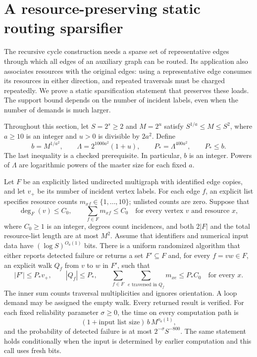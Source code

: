\section{A resource-preserving static routing sparsifier}
\label{sec:routing-helper}

The recursive cycle construction needs a sparse set of representative edges
through which all edges of an auxiliary graph can be routed.  Its application
also associates resources with the original edges: using a representative
edge consumes its resources in either direction, and repeated traversals must
be charged repeatedly.  We prove a static sparsification statement that
preserves these loads.  The support bound depends on the number of incident
labels, even when the number of demands is much larger.

Throughout this section, let $S=2^s\ge2$ and $M=2^u$ satisfy
$S^{1/a}\le M\le S^2$, where $a\ge10$ is an integer and $u>0$ is divisible
by $2a^2$.  Define
\begin{equation}\label{route:parameters}
 b=M^{1/a^2},\qquad
 \Lambda=2^{1000a^2}(1+u),\qquad P_*=\Lambda^{400a^2},
 \qquad P_*\le b.
\end{equation}
The last inequality is a checked prerequisite.  In particular, $b$ is an
integer.  Powers of $\Lambda$ are logarithmic powers of the master size for
each fixed $a$.

\begin{lemma}\label{lem:routing-helper}
Let $F$ be an explicitly listed undirected multigraph with identified edge
copies, and let $v_+$ be its number of incident vertex labels.  For each
edge $f$, an explicit list specifies resource counts
$m_{xf}\in\{1,\ldots,10\}$; unlisted counts are zero.  Suppose that
\[
 \deg_F(v)\le C_0,\qquad \sum_{f\in F}m_{xf}\le C_0
 \quad\text{for every vertex $v$ and resource $x$},
\]
where $C_0\ge1$ is an integer, degrees count incidences, and both $2|F|$
and the total resource-list length are at most $M^2$.
Assume that identifiers and numerical input data have
$(\log S)^{O_a(1)}$ bits.  There is a uniform randomized algorithm that
either reports detected failure or returns a set $F'\subseteq F$ and,
for every $f=vw\in F$, an explicit walk $Q_f$ from $v$ to $w$ in $F'$,
such that
\begin{equation}\label{route:guarantees}
 |F'|\le P_*v_+,\qquad
 |Q_f|\le P_*,\qquad
 \sum_{f\in F}\ \sum_{e\text{ traversed in }Q_f}m_{xe}
       \le P_*C_0\quad\text{for every $x$}.
\end{equation}
The inner sum counts traversal multiplicities and ignores orientation.
A loop demand may be assigned the empty walk.  Every returned result is
verified.  For each fixed reliability parameter $\sigma\ge0$, the time
on every computation path is
\begin{equation}\label{route:time}
 (1+\text{input list size})\,b\,M^{o_a(1)},
\end{equation}
and the probability of detected failure is at most
$2^{-\sigma}S^{-800}$.  The same statement holds conditionally when the
input is determined by earlier computation and this call uses fresh bits.
\end{lemma}

